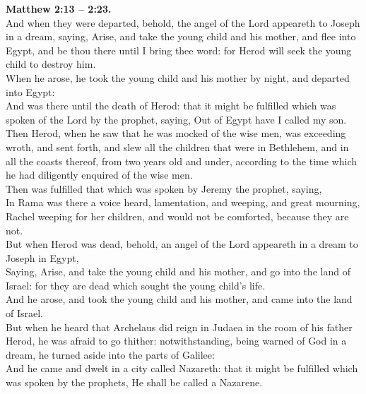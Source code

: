 \documentclass[10pt]{article} %
\begin{document}
{\begin{minipage}[t]{0.45\textwidth}
\textbf{Matthew 2:13 -- 2:23.}\\
And when they were departed, behold, the angel of the Lord appeareth to Joseph in a dream, saying, Arise, and take the young child and his mother, and flee into Egypt, and be thou there until I bring thee word: for Herod will seek the young child to destroy him.\\
When he arose, he took the young child and his mother by night, and departed into Egypt:\\
And was there until the death of Herod: that it might be fulfilled which was spoken of the Lord by the prophet, saying, Out of Egypt have I called my son.\\
Then Herod, when he saw that he was mocked of the wise men, was exceeding wroth, and sent forth, and slew all the children that were in Bethlehem, and in all the coasts thereof, from two years old and under, according to the time which he had diligently enquired of the wise men.\\
Then was fulfilled that which was spoken by Jeremy the prophet, saying,\\
In Rama was there a voice heard, lamentation, and weeping, and great mourning, Rachel weeping for her children, and would not be comforted, because they are not.\\
But when Herod was dead, behold, an angel of the Lord appeareth in a dream to Joseph in Egypt,\\
Saying, Arise, and take the young child and his mother, and go into the land of Israel: for they are dead which sought the young child's life.\\
And he arose, and took the young child and his mother, and came into the land of Israel.\\
But when he heard that Archelaus did reign in Judaea in the room of his father Herod, he was afraid to go thither: notwithstanding, being warned of God in a dream, he turned aside into the parts of Galilee:\\
And he came and dwelt in a city called Nazareth: that it might be fulfilled which was spoken by the prophets, He shall be called a Nazarene.\\
\end{minipage}}
\vspace*{\fill}
\newpage\huge
\vspace*{\fill}
\singlespacing %
\end{document}
